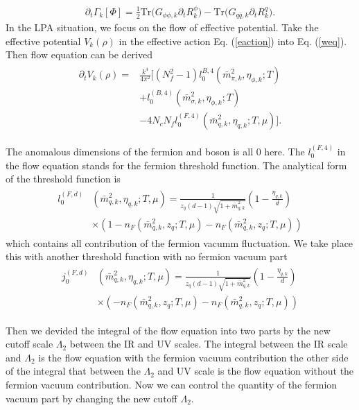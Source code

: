 \documentclass[%
reprint,
superscriptaddress,
showpacs,preprintnumbers,
 amsmath,amssymb,
 aps,
prl,
]{revtex4-1}
\begin{document}
\begin{align}
\partial_t \Gamma_k[\Phi]=\frac{1}{2}\mathrm{Tr}\big(G_{\phi\phi,k}\partial_t R^\phi_k\big)-\mathrm{Tr}\big(G_{q\bar{q},k}\partial_t R^q_k\big).
\label{weq}
\end{align}
 In the LPA situation, we focus on the flow of effective potential. Take the effective potential $V_k(\rho)$ in the effective action Eq. (\ref{eaction}) into Eq. (\ref{weq}). Then flow equation can be derived
\begin{align}
\begin{split}
   \partial_t V_k(\rho)=&\frac{k^4}{4\pi^2}\big[(N^2_f-1)l^{B,4}_{0}(\bar{m}^2_{\pi,k},\eta_{\phi,k};T)\\
   &+l^{(B,4)}_{0}(\bar{m}^2_{\sigma,k},\eta_{\phi,k};T)\\
   &-4N_cN_fl^{(F,4)}_{0}(\bar{m}^2_{q,k},\eta_{q,k};T,\mu)\big].
\end{split}
\end{align}
\par The anomalous dimensions of the fermion and boson is all 0 here. The $l^{(F,4)}_{0}$ in the flow equation stands for the fermion threshold function. The analytical form of the threshold function is 
\begin{align}
\begin{split}
l^{(F,d)}_{0}&(\bar{m}^2_{q,k},\eta_{q,k};T,\mu)=\frac{1}{z_q(d-1)\sqrt{1+\bar{m}^2_{q,k}}}(1-\frac{\eta_{q,k}}{d})\\
&\times(1-n_F(\bar{m}^2_{q,k},z_q;T,\mu)-n_F(\bar{m}^2_{q,k},z_q;T,\mu))
\end{split}
\end{align}
which contains all contribution of the fermion vacumm fluctuation. We take place this with another threshold function with no fermion vacuum part 
\begin{align}
\begin{split}
j^{(F,d)}_{0}&(\bar{m}^2_{q,k},\eta_{q,k};T,\mu)=\frac{1}{z_q(d-1)\sqrt{1+\bar{m}^2_{q,k}}}(1-\frac{\eta_{q,k}}{d})\\
&\times(-n_F(\bar{m}^2_{q,k},z_q;T,\mu)-n_F(\bar{m}^2_{q,k},z_q;T,\mu))
\end{split}
\end{align}
\par Then we devided the integral of the flow equation into two parts by the new cutoff scale $\Lambda_2$ between the IR and UV scales. The integral between the IR scale and $\Lambda_2$ is the flow equation with the fermion vacuum contribution the other side of the integral that between the $\Lambda_2$ and UV scale is the flow equation without the fermion vacuum contribution. Now we can control the quantity of the fermion vacuum part by changing the new cutoff $\Lambda_2$.
\end{document}

